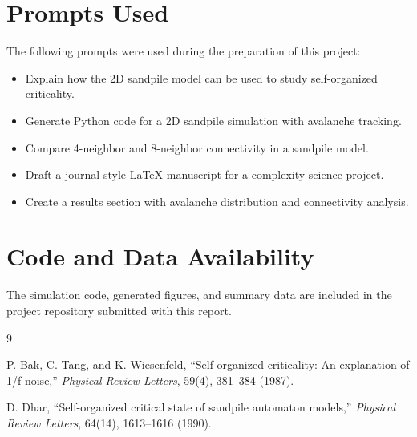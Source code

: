 \documentclass[12pt]{article}
\begin{document}
\section{Prompts Used}
The following prompts were used during the preparation of this project:
\begin{itemize}
    \item Explain how the 2D sandpile model can be used to study self-organized criticality.
    \item Generate Python code for a 2D sandpile simulation with avalanche tracking.
    \item Compare 4-neighbor and 8-neighbor connectivity in a sandpile model.
    \item Draft a journal-style LaTeX manuscript for a complexity science project.
    \item Create a results section with avalanche distribution and connectivity analysis.
\end{itemize}

\section{Code and Data Availability}
The simulation code, generated figures, and summary data are included in the project repository submitted with this report.

\begin{thebibliography}{9}

P. Bak, C. Tang, and K. Wiesenfeld,
``Self-organized criticality: An explanation of 1/f noise,''
\textit{Physical Review Letters}, 59(4), 381--384 (1987).

D. Dhar,
``Self-organized critical state of sandpile automaton models,''
\textit{Physical Review Letters}, 64(14), 1613--1616 (1990).

\end{thebibliography}
\end{document}
